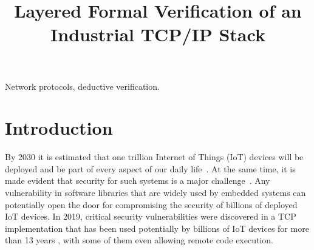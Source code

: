 \documentclass[conference]{IEEEtran}
\begin{document}
\title{Layered Formal Verification of an Industrial TCP/IP Stack}

\author{%
\and
{}
\and
{}
\and
{}
}

\maketitle

\begin{abstract}
\end{abstract}

\begin{IEEEkeywords}
Network protocols,
deductive verification.
\end{IEEEkeywords}

\section{Introduction}

By 2030 it is estimated that one trillion Internet of Things (IoT) devices will be deployed and be part of every aspect of our daily life~\cite{IoT_route:ARM_white_paper}. At the same time, it is made evident that security for such systems is a major challenge~\cite{Sec_IoT_Challenges:paper,Cyber_Systems_security:paper}. Any vulnerability in software libraries that are widely used by embedded systems can potentially open the door for compromising the security of billions of deployed IoT devices. In 2019, critical security vulnerabilities were discovered in a TCP implementation that has been used potentially by billions of IoT devices for more than 13 years \cite{zero_days_vuln:ARMIS_white_paper}, with some of them even allowing remote code execution.
\end{document}
